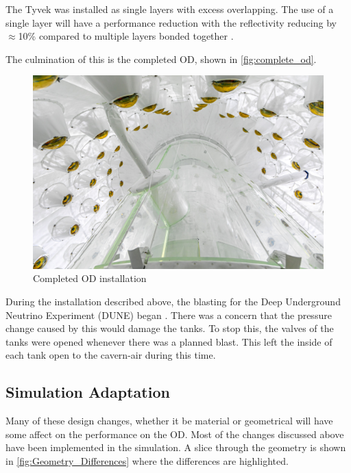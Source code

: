 \par
The Tyvek was installed as single layers with excess overlapping.
The use of a single layer will have a performance reduction with the reflectivity reducing by $\approx$10\% compared to multiple layers bonded together \cite{tyvek_reflectivity_ref}.

\par
The culmination of this is the completed OD, shown in \autoref{fig:complete_od}.

\begin{figure}[!tbph]
\includegraphics[width=\textwidth]{Figures/Construction/od_complete.jpg}
\centering
\caption{Completed OD installation}
\label{fig:complete_od}
\end{figure}

\par
During the installation described above, the blasting for the Deep Underground Neutrino Experiment (DUNE) began \cite{dune_blasting_ref}.
There was a concern that the pressure change caused by this would damage the tanks.
To stop this, the valves of the tanks were opened whenever there was a planned blast.
This left the inside of each tank open to the cavern-air during this time.

\subsection{Simulation Adaptation}
\par
Many of these design changes, whether it be material or geometrical will have some affect on the performance on the OD.
Most of the changes discussed above have been implemented in the simulation.
A slice through the geometry is shown in \autoref{fig:Geometry_Differences} where the differences are highlighted.


